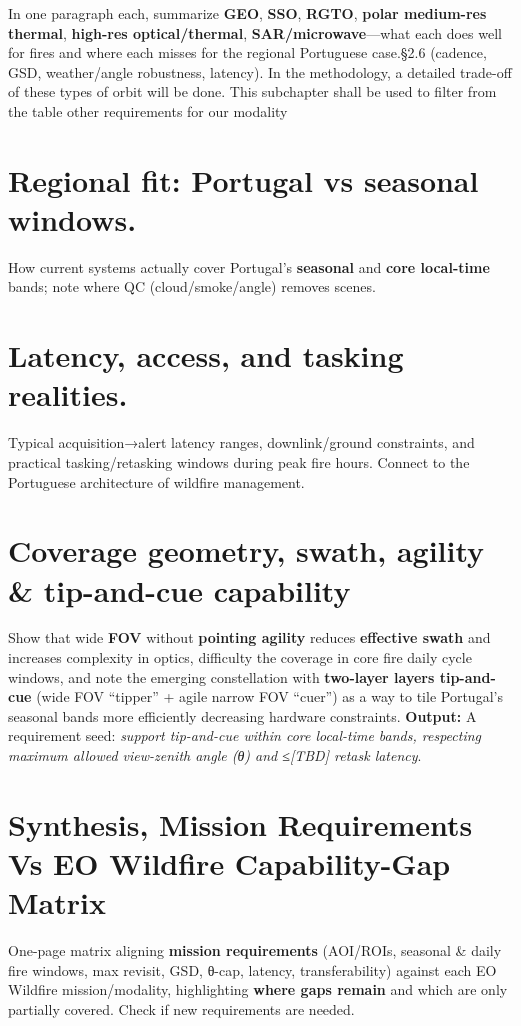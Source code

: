 In one paragraph each, summarize \textbf{GEO}, \textbf{SSO},
\textbf{RGTO}, \textbf{polar medium-res thermal}, \textbf{high-res
optical/thermal}, \textbf{SAR/microwave}---what each does well for fires
and where each misses for the regional Portuguese case.§2.6 (cadence,
GSD, weather/angle robustness, latency). In the methodology, a detailed
trade-off of these types of orbit will be done. This subchapter shall be
used to filter from the table other requirements for our modality

\section{Regional fit: Portugal vs seasonal
windows.}\label{44-regional-fit-portugal-vs-seasonal-windows}

How current systems actually cover Portugal's \textbf{seasonal} and
\textbf{core local-time} bands; note where QC (cloud/smoke/angle)
removes scenes.

\section{Latency, access, and tasking
realities.}\label{46-latency-access-and-tasking-realities}

Typical acquisition→alert latency ranges, downlink/ground constraints,
and practical tasking/retasking windows during peak fire hours. Connect
to the Portuguese architecture of wildfire management.

\section{Coverage geometry, swath, agility \& tip-and-cue
capability}\label{47-coverage-geometry-swath-agility--tip-and-cue-capability}

Show that wide \textbf{FOV} without \textbf{pointing agility} reduces
\textbf{effective swath} and increases complexity in optics, difficulty
the coverage in core fire daily cycle windows, and note the emerging
constellation with \textbf{two-layer layers tip-and-cue} (wide FOV
``tipper'' + agile narrow FOV ``cuer'') as a way to tile Portugal's
seasonal bands more efficiently decreasing hardware constraints.
\textbf{Output:} A requirement seed: \emph{support tip-and-cue within
core local-time bands, respecting maximum allowed view-zenith angle (θ)
and ≤{[}TBD{]} retask latency}.

\section{Synthesis, Mission Requirements Vs EO Wildfire
Capability-Gap
Matrix}\label{48--synthesis-mission-requirements-vs-eo-wildfire-capability-gap-matrix}

One-page matrix aligning \textbf{mission requirements} (AOI/ROIs,
seasonal \& daily fire windows, max revisit, GSD, θ-cap, latency,
transferability) against each EO Wildfire mission/modality, highlighting
\textbf{where gaps remain} and which are only partially covered. Check
if new requirements are needed.

